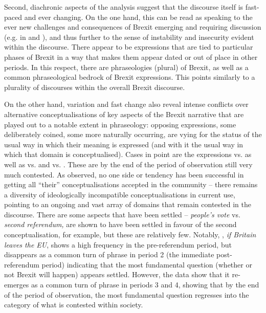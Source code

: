 \documentclass[output=paper]{langscibook}
\begin{document}
Second, diachronic aspects of the analysis suggest that the discourse itself is fast-paced and ever changing. On the one hand, this can be read as speaking to the ever new challenges and consequences of Brexit emerging and requiring discussion (e.g. in  and ), and thus further to the sense of instability and insecurity evident within the discourse. There appear to be expressions that are tied to particular phases of Brexit in a way that makes them appear dated or out of place in other periods. In this respect, there are phraseologies (plural) of Brexit, as well as a common phraseological bedrock of Brexit expressions. This points similarly to a plurality of discourses within the overall Brexit discourse.

On the other hand, variation and fast change also reveal intense conflicts over alternative conceptualisations of key aspects of the Brexit narrative that are played out to a notable extent in phraseology: opposing expressions, some deliberately coined, some more naturally occurring, are vying for the status of the usual way in which their meaning is expressed (and with it the usual way in which that domain is conceptualised). Cases in point are the expressions  vs.  as well as  vs.  and  vs. . These are by the end of the period of observation still very much contested. As observed, no one side or tendency has been successful in getting all ``their'' conceptualisations accepted in the community -- there remains a diversity of ideologically incompatible conceptualisations in current use, pointing to an ongoing and vast array of domains that remain contested in the discourse. There are some aspects that have been settled -- \textit{people’s vote} vs. \textit{second referendum,} are shown to have been settled in favour of the second conceptualisation, for example, but these are relatively few. Notably, , \textit{if Britain leaves the EU}, shows a high frequency in the pre-referendum period, but disappears as a common turn of phrase in period 2 (the immediate post-referendum period) indicating that the most fundamental question (whether or not Brexit will happen) appears settled. However, the data show that it re-emerges as a common turn of phrase in periods 3 and 4, showing that by the end of the period of observation, the most fundamental question regresses into the category of what is contested within society.
\end{document}
